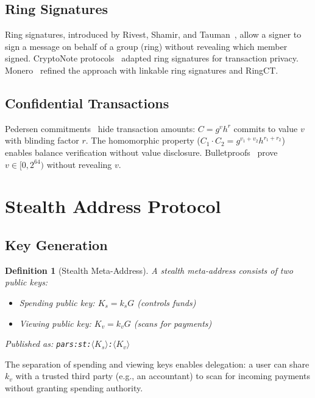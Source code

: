 \documentclass[11pt,a4paper]{article}
\newtheorem{definition}{Definition}[section]
\begin{document}
\subsection{Ring Signatures}

Ring signatures, introduced by Rivest, Shamir, and
Tauman~\cite{rivest2001leak}, allow a signer to sign a message on behalf
of a group (ring) without revealing which member signed.  CryptoNote
protocols~\cite{van2013cryptonote} adapted ring signatures for
transaction privacy.  Monero~\cite{noether2015ring} refined the approach
with linkable ring signatures and RingCT.

\subsection{Confidential Transactions}

Pedersen commitments~\cite{pedersen1991non} hide transaction amounts:
$C = g^v h^r$ commits to value $v$ with blinding factor $r$.  The
homomorphic property ($C_1 \cdot C_2 = g^{v_1+v_2} h^{r_1+r_2}$) enables
balance verification without value disclosure.
Bulletproofs~\cite{bunz2018bulletproofs} prove $v \in [0, 2^{64})$
without revealing $v$.

\section{Stealth Address Protocol}
\label{sec:stealth}

\subsection{Key Generation}

\begin{definition}[Stealth Meta-Address]
    A stealth meta-address consists of two public keys:
    \begin{itemize}
        \item Spending public key: $K_s = k_s G$ (controls funds)
        \item Viewing public key: $K_v = k_v G$ (scans for payments)
    \end{itemize}
    Published as: \texttt{pars:st:$\langle K_s \rangle$:$\langle K_v \rangle$}
\end{definition}

The separation of spending and viewing keys enables delegation: a user can
share $k_v$ with a trusted third party (e.g., an accountant) to scan for
incoming payments without granting spending authority.
\end{document}
